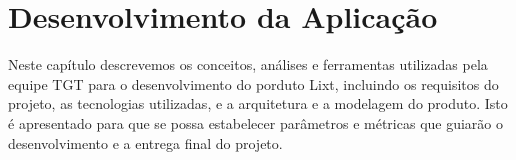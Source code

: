 \chapter{Desenvolvimento da Aplicação}

Neste capítulo descrevemos os conceitos, análises e ferramentas
utilizadas pela equipe TGT para o desenvolvimento do porduto Lixt,
incluindo os requisitos do projeto, as tecnologias utilizadas, e a
arquitetura e a modelagem do produto.
Isto é apresentado para que se possa estabelecer parâmetros e métricas
que guiarão o desenvolvimento e a entrega final do projeto.














